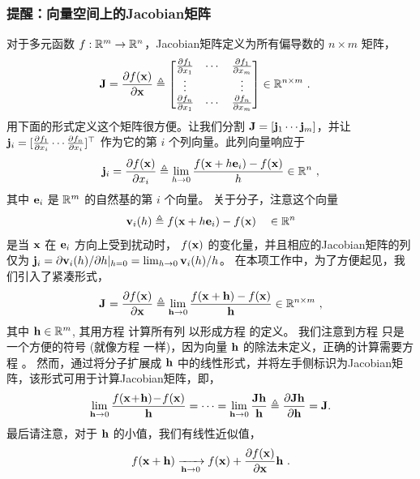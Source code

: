 \subsubsection[Jacobians on vector spaces]{提醒：向量空间上的Jacobian矩阵}

对于多元函数 $f:{\mathbb R}^m\to{\mathbb R}^n$，Jacobian矩阵定义为所有偏导数的 $n\times m$ 矩阵， 
%
\begin{align}\label{equ:jac_Rn_matrix}
{\bf J} = \frac{\partial f({\bf x})}{\partial{\bf x}} &\triangleq \begin{bmatrix}
\frac{\partial f_1}{\partial x_1} & \cdots & \frac{\partial f_1}{\partial x_m} \\
\vdots && \vdots \\
\frac{\partial f_n}{\partial x_1} & \cdots & \frac{\partial f_n}{\partial x_m} 
\end{bmatrix} \in{\mathbb R}^{n\times m}
~.
\end{align}
%
用下面的形式定义这个矩阵很方便。让我们分割 ${\bf J}=[{\bf j}_1\cdots{\bf j}_m]$，并让 ${\bf j}_i=[\frac{\partial f_1}{\partial x_i}\cdots\frac{\partial f_n}{\partial x_i}]^{\top}$ 作为它的第 $i$ 个列向量。此列向量响应于
%
\begin{align}\label{equ:jac_Rn_i}
{\bf j}_i = \frac{\partial f({\bf x})}{\partial x_i} \triangleq \lim_{h\to0}\frac{f({\bf x}+h{\bf e}_i)-f({\bf x})}{h} \in {\mathbb R}^n
~,
\end{align}
%
其中 ${\bf e}_i$ 是 ${\mathbb R}^m$ 的自然基的第 $i$ 个向量。
关于分子，注意这个向量 
%
\begin{align}\label{equ:jac_Rn_vec}
{\bf v}_i(h) \triangleq f({\bf x}+h{\bf e}_i)-f({\bf x}) \quad \in{\mathbb R}^n
\end{align}
%
是当 ${\bf x}$ 在 ${\bf e}_i$ 方向上受到扰动时， $f({\bf x})$ 的变化量，并且相应的Jacobian矩阵的列仅为 ${\bf j}_i=\partial{\bf v}_i(h)/\partial h|_{h=0}=\lim_{h\to0}{\bf v}_i(h)/h$。
在本项工作中，为了方便起见，我们引入了紧凑形式，
%
\begin{align}\label{equ:jac_Rn}
{{\bf J}^{}_{}}=\frac{\partial f({\bf x})}{\partial{\bf x}}\triangleq\lim_{{\bf h}\to0}\frac{f({\bf x}+{\bf h})-f({\bf x})}{{\bf h}}
\in{\mathbb R}^{n\times m}
~,
\end{align}
%
其中 ${\bf h}\in{\mathbb R}^m$, 其用方程  计算所有列
以形成方程  的定义。
我们注意到方程  只是一个方便的符号 (就像方程  一样)，因为向量 ${\bf h}$ 的除法未定义，正确的计算需要方程  。
然而，通过将分子扩展成 ${\bf h}$ 中的线性形式，并将左手侧标识为Jacobian矩阵，该形式可用于计算Jacobian矩阵，即，
%
\begin{align}\label{equ:jac_Rn_identify}
  \lim_{{\bf h}\to0}\frac{f({\bf x}\!+\!{\bf h})\!-\!f({\bf x})}{{\bf h}} 
  = \cdots
  = \lim_{{\bf h}\to0}\frac{{\bf J}{\bf h}}{{\bf h}}   
  \triangleq \frac{\partial{\bf J}{\bf h}}{\partial{\bf h}} 
  = {\bf J}.
\end{align}
%
最后请注意，对于 ${\bf h}$ 的小值，我们有线性近似值，
%
\begin{align}
f({\bf x}+{\bf h}) \xrightarrow[{\bf h}\to0]{} f({\bf x}) + \frac{\partial f({\bf x})}{\partial{\bf x}}{\bf h}
~.
\end{align}

